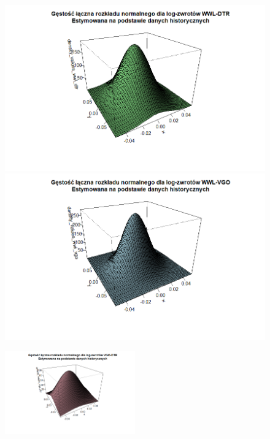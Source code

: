 \documentclass[a4paper,11pt]{article}
\begin{document}
\begin{figure}[!htb]
  \includegraphics[width=\linewidth]{./img/gestosc-laczna-wwl-dtr.png}
\endminipage\hfill
{}
  \includegraphics[width=\linewidth]{./img/gestosc-laczna-wwl-vgo.png}
\endminipage\hfill
\end{figure}
\begin{figure}[H]
    \centering
    \includegraphics[width=0.5\textwidth]{./img/gestosc-laczna-vgo-dtr.png}
\end{figure}
\end{document}
